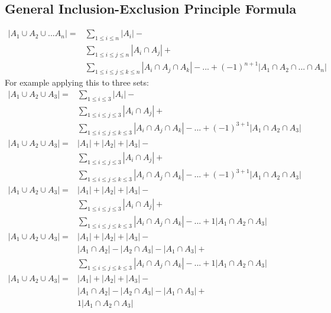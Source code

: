 \documentclass{article}
\begin{document}
\subsection{General Inclusion-Exclusion Principle Formula}
\begin{align*}
|A_1\cup A_2\cup...A_n| = &\sum_{1\leq i \leq n}|A_i| - \\&\sum_{1\leq i \le j \leq n}|A_i \cap A_j| + \\ & \sum_{1 \leq i \le j \le k \leq n}|A_i \cap A_j \cap A_k| - ... + (-1)^{n+1}|A_1\cap A_2\cap ... \cap A_n|
\end{align*}
For example applying this to three sets: 
\begin{align*}
|A_1 \cup A_2 \cup A_3| =  &\sum_{1\leq i \leq 3}|A_i|  - \\&\sum_{1\leq i \le j \leq 3}|A_i \cap A_j| + \\ & \sum_{1 \leq i \le j \le k \leq 3}|A_i \cap A_j \cap A_k| - ... + (-1)^{3+1}|A_1\cap A_2 \cap A_3| \\
|A_1 \cup A_2 \cup A_3| = & |A_1| + |A_2| + |A_3|   - \\&\sum_{1\leq i \le j \leq 3}|A_i \cap A_j| + \\ & \sum_{1 \leq i \le j \le k \leq 3}|A_i \cap A_j \cap A_k| - ... + (-1)^{3+1}|A_1\cap A_2 \cap A_3| \\
|A_1 \cup A_2 \cup A_3| = & |A_1| + |A_2| + |A_3|   - \\&\sum_{1\leq i \le j \leq 3}|A_i \cap A_j| + \\ & \sum_{1 \leq i \le j \le k \leq 3}|A_i \cap A_j \cap A_k| - ... + 1|A_1\cap A_2 \cap A_3| \\
|A_1 \cup A_2 \cup A_3| = & |A_1| + |A_2| + |A_3|    - \\& |A_1 \cap A_2| - |A_2 \cap A_3| - |A_1 \cap A_3| + \\ & \sum_{1 \leq i \le j \le k \leq 3}|A_i \cap A_j \cap A_k| - ... + 1|A_1\cap A_2 \cap A_3| \\
|A_1 \cup A_2 \cup A_3| = & |A_1| + |A_2| + |A_3|  - \\& |A_1 \cap A_2| - |A_2 \cap A_3| - |A_1 \cap A_3| + \\ & 1|A_1\cap A_2 \cap A_3| \\
\end{align*}
\end{document}
